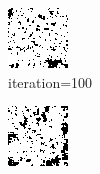 \documentclass{article}
\begin{document}
\begin{figure}[h]
\begin{subfigure}[t]{0.18\textwidth}
\includegraphics[width=\textwidth]{./computational/results/gibbs_node_sampler_positive_iter_100.png}
\vspace{-0.6cm}
\caption{iteration=100}
\end{subfigure}\hspace{0.01\textwidth}
\begin{subfigure}[t]{0.18\textwidth}
\centering
\includegraphics[width=\textwidth]{./computational/results/gibbs_node_sampler_positive_iter_200.png}

\end{subfigure}
\end{figure}
\end{document}
